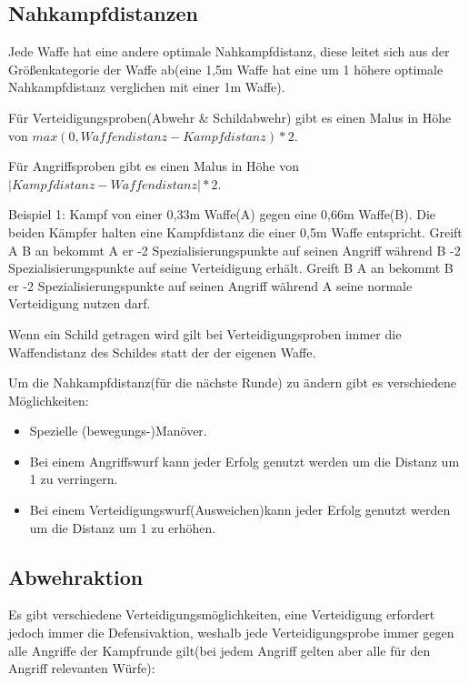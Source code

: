 \subsection{Nahkampfdistanzen}
Jede Waffe hat eine andere optimale Nahkampfdistanz, diese leitet sich aus der Größenkategorie der Waffe ab(eine 1,5m Waffe hat eine um 1 höhere optimale Nahkampfdistanz verglichen mit einer 1m Waffe).

Für Verteidigungsproben(Abwehr \& Schildabwehr) gibt es einen Malus in Höhe von $max(0,Waffendistanz-Kampfdistanz)*2$.

Für Angriffsproben gibt es einen Malus in Höhe von $|Kampfdistanz-Waffendistanz|*2$.

Beispiel 1: Kampf von einer 0,33m Waffe(A) gegen eine 0,66m Waffe(B). Die beiden Kämpfer halten eine Kampfdistanz die einer 0,5m Waffe entspricht.
Greift A B an bekommt A er -2 Spezialisierungspunkte auf seinen Angriff während B -2 Spezialisierungspunkte auf seine Verteidigung erhält.
Greift B A an bekommt B er -2 Spezialisierungspunkte auf seinen Angriff während A seine normale Verteidigung nutzen darf.

Wenn ein Schild getragen wird gilt bei Verteidigungsproben immer die Waffendistanz des Schildes statt der der eigenen Waffe.

Um die Nahkampfdistanz(für die nächste Runde) zu ändern gibt es verschiedene Möglichkeiten:
\begin{itemize}
\item Spezielle (bewegungs-)Manöver.
\item Bei einem Angriffswurf kann jeder Erfolg genutzt werden um die Distanz um 1 zu verringern.
\item Bei einem Verteidigungswurf(Ausweichen)kann jeder Erfolg genutzt werden um die Distanz um 1 zu erhöhen.
\end{itemize}

\subsection{Abwehraktion}
Es gibt verschiedene Verteidigungsmöglichkeiten, eine Verteidigung erfordert jedoch immer die Defensivaktion, weshalb jede Verteidigungsprobe immer gegen alle Angriffe der Kampfrunde gilt(bei jedem Angriff gelten aber alle für den Angriff relevanten Würfe):

